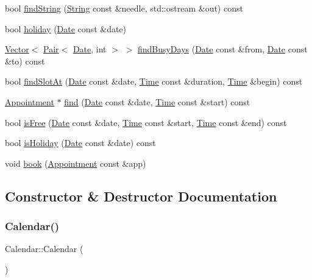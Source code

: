 \begin{DoxyCompactItemize}
bool \hyperlink{classCalendar_accc025455e06e4031b9b76fe1a35220d}{find\+String} (\hyperlink{classString}{String} const \&needle, std\+::ostream \&out) const
\item 
bool \hyperlink{classCalendar_aa54f943234aebe06350ae6545804dd0a}{holiday} (\hyperlink{classDate}{Date} const \&date)
\item 
\hyperlink{classVector}{Vector}$<$ \hyperlink{structPair}{Pair}$<$ \hyperlink{classDate}{Date}, int $>$ $>$ \hyperlink{classCalendar_a33727e15bb2186dbdc1fe227dfa0a6e6}{find\+Busy\+Days} (\hyperlink{classDate}{Date} const \&from, \hyperlink{classDate}{Date} const \&to) const
\item 
bool \hyperlink{classCalendar_aecc060737b760817e814121df59a9316}{find\+Slot\+At} (\hyperlink{classDate}{Date} const \&date, \hyperlink{classTime}{Time} const \&duration, \hyperlink{classTime}{Time} \&begin) const
\item 
\hyperlink{classAppointment}{Appointment} $\ast$ \hyperlink{classCalendar_a249805cf48297698e30512ff9a47bac3}{find} (\hyperlink{classDate}{Date} const \&date, \hyperlink{classTime}{Time} const \&start) const
\item 
bool \hyperlink{classCalendar_abd5c6a36628d47bae770f807254fb639}{is\+Free} (\hyperlink{classDate}{Date} const \&date, \hyperlink{classTime}{Time} const \&start, \hyperlink{classTime}{Time} const \&end) const
\item 
bool \hyperlink{classCalendar_ae1d1e8979866bb2d03c4e66d801fdebf}{is\+Holiday} (\hyperlink{classDate}{Date} const \&date) const
\item 
void \hyperlink{classCalendar_a1dbd9019e73644ee8bf5611884ac5d75}{book} (\hyperlink{classAppointment}{Appointment} const \&app)
\end{DoxyCompactItemize}


\subsection{Constructor \& Destructor Documentation}
\mbox{\label{classCalendar_a568f7ef431263d9667286aebac96febf}} 
\subsubsection{\texorpdfstring{Calendar()}{Calendar()}\hspace{0.1cm}{\footnotesize\ttfamily [1/3]}}
{\footnotesize\ttfamily Calendar\+::\+Calendar (\begin{DoxyParamCaption}{ }\end{DoxyParamCaption})\hspace{0.3cm}{\ttfamily [default]}}

